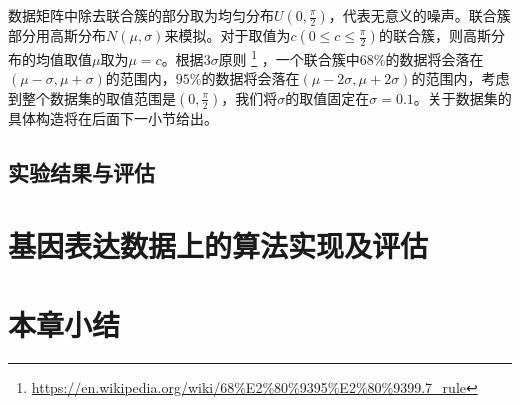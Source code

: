 数据矩阵中除去联合簇的部分取为均匀分布$U(0,\frac{\pi}{2})$，代表无意义的噪声。联合簇部分用高斯分布$N(\mu,\sigma)$来模拟。对于取值为$c(0\le{}c\le\frac{\pi}{2})$的联合簇，则高斯分布的均值取值$\mu$取为$\mu=c$。根据$3\sigma$原则
\footnote{\url{https://en.wikipedia.org/wiki/68\%E2\%80\%9395\%E2\%80\%9399.7_rule}}
，一个联合簇中$68\%$的数据将会落在$(\mu-\sigma,\mu+\sigma)$的范围内，$95\%$的数据将会落在$(\mu-2\sigma,\mu+2\sigma)$的范围内，考虑到整个数据集的取值范围是$(0,\frac{\pi}{2})$，我们将$\sigma$的取值固定在$\sigma=0.1$。关于数据集的具体构造将在后面下一小节给出。



\subsection{实验结果与评估}
\label{subsec:artificial}

\section{基因表达数据上的算法实现及评估}
\label{sec:gene}
\section{本章小结}

